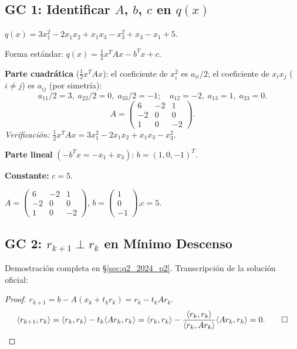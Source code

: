 \documentclass[11pt,a4paper]{article}
\begin{document}
\subsection{GC 1: Identificar $A$, $b$, $c$ en $q(x)$}
\label{sec:gc_cuadratica}

$q(x) = 3x_1^2 - 2x_1x_2 + x_1x_3 - x_3^2 + x_3 - x_1 + 5$.

Forma estándar: $q(x) = \tfrac{1}{2}x^TAx - b^Tx + c$.

\textbf{Parte cuadrática} ($\tfrac{1}{2}x^TAx$): el coeficiente de $x_i^2$ es $a_{ii}/2$;
el coeficiente de $x_ix_j$ ($i\neq j$) es $a_{ij}$ (por simetría):
\[
  a_{11}/2 = 3,\; a_{22}/2=0,\; a_{33}/2=-1;\quad a_{12}=-2,\; a_{13}=1,\; a_{23}=0.
\]
\[
  A = \begin{pmatrix}6&-2&1\\-2&0&0\\1&0&-2\end{pmatrix}.
\]
\textit{Verificación:} $\tfrac{1}{2}x^TAx = 3x_1^2-2x_1x_2+x_1x_3-x_3^2$.\;\checkmark

\textbf{Parte lineal} $(-b^Tx = -x_1 + x_3)$: $b = (1,0,-1)^T$.

\textbf{Constante:} $c = 5$.

\begin{tcolorbox}[clave]
$A = \begin{pmatrix}6&-2&1\\-2&0&0\\1&0&-2\end{pmatrix}$,\quad
$b = \begin{pmatrix}1\\0\\-1\end{pmatrix}$,\quad $c = 5$.
\end{tcolorbox}

\subsection{GC 2: $r_{k+1}\perp r_k$ en Mínimo Descenso}

Demostración completa en \S\ref{sec:q2_2024_p2}. Transcripción de la solución oficial:

\begin{proof}
$r_{k+1} = b - A(x_k + t_kr_k) = r_k - t_kAr_k$.
\[
  \langle r_{k+1},r_k\rangle
  = \langle r_k,r_k\rangle - t_k\langle Ar_k,r_k\rangle
  = \langle r_k,r_k\rangle
    - \frac{\langle r_k,r_k\rangle}{\langle r_k,Ar_k\rangle}\langle Ar_k,r_k\rangle = 0. \qed
\]
\end{proof}
\end{document}
